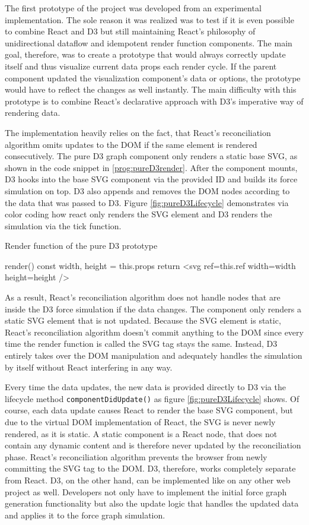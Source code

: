 The first prototype of the project was developed from an experimental implementation. The sole reason it was realized was to test if it is even possible to combine React and D3 but still maintaining React's philosophy of unidirectional dataflow and idempotent render function components. The main goal, therefore, was to create a prototype that would always correctly update itself and thus visualize current data props each render cycle. If the parent component updated the visualization component's data or options, the prototype would have to reflect the changes as well instantly. The main difficulty with this prototype is to combine React's declarative approach with D3's imperative way of rendering data.

The implementation heavily relies on the fact, that React's reconciliation algorithm omits updates to the DOM if the same element is rendered consecutively. The pure D3 graph component only renders a static base SVG, as shown in the code snippet in \ref{prog:pureD3render}. After the component mounts, D3 hooks into the base SVG component via the provided ID and builds its force simulation on top. D3 also appends and removes the DOM nodes according to the data that was passed to D3. Figure \ref{fig:pureD3Lifecycle} demonstrates via color coding how react only renders the SVG element and D3 renders the simulation via the tick function.

\begin{program}[H]
\caption{Render function of the pure D3 prototype}
\label{prog:pureD3render}
\begin{JsCode}
render() {
  const { width, height } = this.props
  return <svg ref={this.ref} width={width} height={height} />
}
\end{JsCode}
\end{program}

As a result, React's reconciliation algorithm does not handle nodes that are inside the D3 force simulation if the data changes. The component only renders a static SVG element that is not updated. Because the SVG element is static, React's reconciliation algorithm doesn't commit anything to the DOM since every time the render function is called the SVG tag stays the same. Instead, D3 entirely takes over the DOM manipulation and adequately handles the simulation by itself without React interfering in any way.

Every time the data updates, the new data is provided directly to D3 via the lifecycle method \texttt{componentDidUpdate()} as figure \ref{fig:pureD3Lifecycle} shows. Of course, each data update causes React to render the base SVG component, but due to the virtual DOM implementation of React, the SVG is never newly rendered, as it is static. A static component is a React node, that does not contain any dynamic content and is therefore never updated by the reconciliation phase. React's reconciliation algorithm prevents the browser from newly committing the SVG tag to the DOM. D3, therefore, works completely separate from React. D3, on the other hand, can be implemented like on any other web project as well. Developers not only have to implement the initial force graph generation functionality but also the update logic that handles the updated data and applies it to the force graph simulation.

